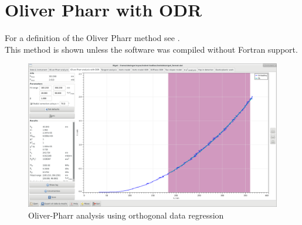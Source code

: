 
\section{Oliver Pharr with ODR}
For a definition of the Oliver Pharr method see \cite{OliverPharr}. \\ 
This method is shown unless the software was compiled without Fortran support.  \\

\begin{figure}[ht]
  \centering
  \includegraphics[width=\textwidth]{images/screen-op-odr}
  \caption{Oliver-Pharr analysis using orthogonal data regression}
\end{figure}

